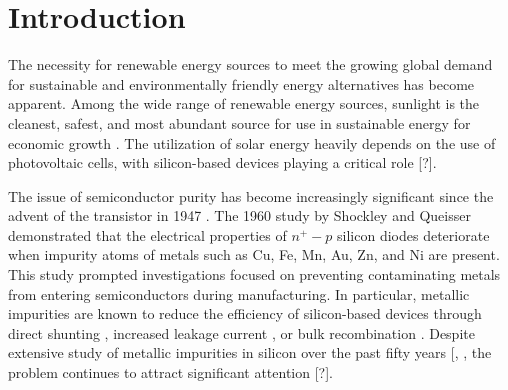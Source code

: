 \documentclass[a4paper,fleqn]{cas-sc}
\begin{document}
\maketitle

\section{Introduction}%
\par
The necessity for renewable energy sources to meet the growing global demand for sustainable and environmentally friendly energy alternatives has become apparent. Among the wide range of renewable energy sources, sunlight is the cleanest, safest, and most abundant source for use in sustainable energy for economic growth \cite{PratapSingh2019}. The utilization of solar energy heavily depends on the use of photovoltaic cells, with silicon-based devices playing a critical role [?].


The issue of semiconductor purity has become increasingly significant since the advent of the transistor in 1947 \cite{Claers2018}. The 1960 study by Shockley and Queisser \cite{Goetzberger1960} demonstrated that the electrical properties of $n^{+}-p$ silicon diodes deteriorate when impurity atoms of metals such as Cu, Fe, Mn, Au, Zn, and Ni are present. This study prompted investigations focused on preventing contaminating metals from entering semiconductors during manufacturing. In particular, metallic impurities are known to reduce the efficiency of silicon-based devices through direct shunting \cite{Rsh:Breitenstein}, increased leakage current \cite{Lee1980}, or bulk recombination \cite{Istratov2000}. Despite extensive study of metallic impurities in silicon over the past fifty years [\cite{Claers2018}, \cite{Pearce1977}, the problem continues to attract significant attention [?].
\end{document}
